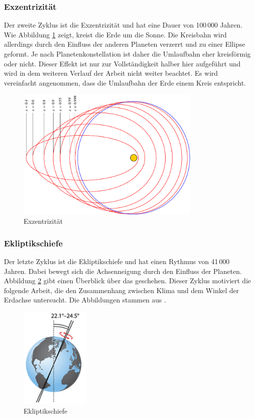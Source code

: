 \begin{refsection}
\subsubsection{Exzentrizität}
Der zweite Zyklus ist die Exzentrizität und hat eine Dauer von
100\,000 Jahren. Wie Abbildung \ref{fig:abb2} zeigt, kreist die Erde
um die Sonne. Die Kreisbahn wird allerdings durch den Einfluss der
anderen Planeten verzerrt und zu einer Ellipse geformt. Je nach
Planetenkonstellation ist daher die Umlaufbahn eher kreisförmig oder
nicht. Dieser Effekt ist nur zur Vollständigkeit halber hier
aufgeführt und wird in dem weiteren Verlauf der Arbeit nicht weiter
beachtet. Es wird vereinfacht angenommen, dass die Umlaufbahn der
Erde einem Kreis entspricht.
%
\begin{figure}
	\centering
	\includegraphics[width= 0.8\textwidth]{neigung/erdbahn.pdf}
	\caption[Exzentrizität]{Exzentrizität}
	\label{fig:abb2}
\end{figure}

\subsubsection{Ekliptikschiefe}
Der letzte Zyklus ist die Ekliptikschiefe und hat einen Rythmus von
41\,000 Jahren. Dabei bewegt sich die Achsenneigung durch den Einfluss
der Planeten. Abbildung \ref{fig:abb3} gibt einen Überblick über
das geschehen. Dieser Zyklus motiviert die folgende Arbeit, die den
Zusammenhang zwischen Klima und dem Winkel der Erdachse untersucht.
Die Abbildungen stammen aus \cite{fm}.
%
\begin{figure}
	\centering
	\includegraphics[width= 0.3\textwidth]{neigung/Obliquity.png}
	\caption[Ekliptikschiefe]{Ekliptikschiefe}
	\label{fig:abb3}
\end{figure}
%


\end{refsection}
